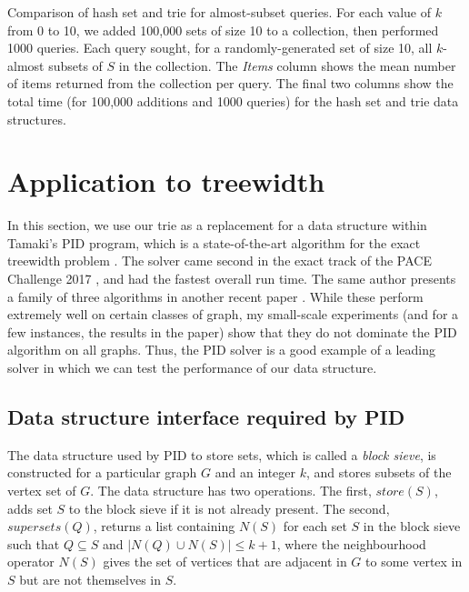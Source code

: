 \begin{table}[h]
    \centering
    
    \caption{Comparison of hash set and trie for almost-subset queries.
        For each value of $k$ from 0 to 10, we added 100,000 sets of size 10
        to a collection, then performed 1000 queries.  Each query sought,
        for a randomly-generated set of size 10, 
        all $k$-almost subsets of $S$ in the collection.  The \emph{Items}
        column shows the mean number of items returned from the collection
        per query.  The final two columns show the total time (for
        100,000 additions and 1000 queries) for the hash set and trie data
        structures.}
    \label{table:experiment1}
\end{table}

\section{Application to treewidth}

In this section, we use our trie as a replacement for a data structure within
Tamaki's PID program, which is a state-of-the-art algorithm for the exact
treewidth problem \cite{DBLP:journals/jco/Tamaki19}.  The solver came second in
the exact track of the PACE Challenge 2017 \cite{DBLP:conf/iwpec/DellKTW17},
and had the fastest overall run time.  The same author presents a family of
three algorithms in another recent paper \cite{DBLP:conf/sea2/Tamaki19}.
While these perform extremely well on certain classes of graph, my small-scale
experiments (and for a few instances, the results in the paper) show that they
do not dominate the PID algorithm on all graphs.  Thus, the PID solver
is a good example of a leading solver in which we can test the performance
of our data structure.

\subsection{Data structure interface required by PID}

The data structure used by PID to store sets, which is called a \emph{block
sieve}, is constructed for a particular graph $G$ and an integer $k$, and stores subsets
of the vertex set of $G$.  The data structure has two operations.  The first,
$\mathit{store}(S)$, adds set $S$ to the block sieve if it is not already present.
The second, $\mathit{supersets}(Q)$, returns a list containing $N(S)$ for each set
$S$ in the block sieve such that $Q \subseteq S$ and $|N(Q) \cup N(S)| \leq k + 1$,
where the neighbourhood operator $N(S)$ gives the set of vertices that are adjacent
in $G$ to some vertex in $S$ but are not themselves in $S$.

